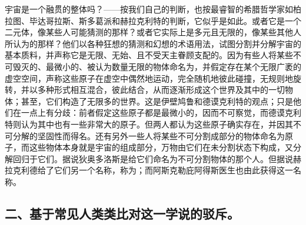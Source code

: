 宇宙是一个融贯的整体吗？——按我们自己的判断，也按最睿智的希腊哲学家如柏拉图、毕达哥拉斯、斯多葛派和赫拉克利特的判断，它似乎是如此。或者它是一个二元体，像某些人可能猜测的那样？或者它实际上是多元且无限的，像某些其他人所认为的那样？他们以各种狂想的猜测和幻想的术语用法，试图分割并分解宇宙的基本质料，并声称它是无限、无始、且不受天主眷顾支配的。因为有些人将某些不可毁灭的、最微小的、被认为数量无限的物体命名为，并假定存在某个无限广袤的虚空空间，声称这些原子在虚空中偶然地运动，完全随机地彼此碰撞，无规则地旋转，并以多种形式相互混合，彼此结合，从而逐渐形成这个世界及其中的一切物体；甚至，它们构造了无限多的世界。这是伊壁鸠鲁和德谟克利特的观点；只是他们在一点上有分歧：前者假定这些原子都是最微小的，因而不可察觉，而德谟克利特则认为其中也有一些非常大的原子。但两人都认为这些原子确实存在，并因其不可分解的坚固性而得名。还有另外一些人将某些不可分割成部分的物体命名为原子，而这些物体本身就是宇宙的组成部分，万物由它们在未分割状态下构成，又分解回归于它们。据说狄奥多洛斯是给它们命名为不可分割物体的那个人。但据说赫拉克利德给了它们另一个名称，称为；而阿斯克勒庇阿得斯医生也由此获得这一名称。\newline{}\par


\subsection{二、基于常见人类类比对这一学说的驳斥。\newline{}}

